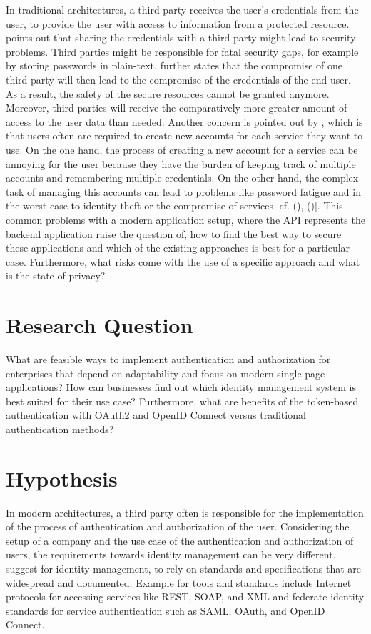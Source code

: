 In traditional architectures, a third party receives the user’s credentials from the user, to provide the user with access to information from a protected resource. \cite{Prasad:MMWPT} points out that sharing the credentials with a third party might lead to security problems. Third parties might be responsible for fatal security gaps, for example by storing passwords in plain-text. \cite{Prasad:MMWPT} further states that the compromise of one third-party will then lead to the compromise of the credentials of the end user. As a result, the safety of the secure resources cannot be granted anymore. Moreover, third-parties will receive the comparatively more greater amount of access to the user data than needed. Another concern is pointed out by \cite{Sakimura:OIDCC}, which is that users often are required to create new accounts for each service they want to use. On the one hand, the process of creating a new account for a service can be annoying for the user because they have the burden of keeping track of multiple accounts and remembering multiple credentials. On the other hand, the complex task of managing this accounts can lead to problems like password fatigue and in the worst case to identity theft or the compromise of services [cf. (\cite{Sakimura:OIDCC}), (\cite{Prasad:MMWPT})].
This common problems with a modern application setup, where the API represents the backend application raise the question of, how to find the best way to secure these applications and which of the existing approaches is best for a particular case. Furthermore, what risks come with the use of a specific approach and what is the state of privacy? 


\section{Research Question}

What are feasible ways to implement authentication and authorization for enterprises that depend on adaptability and focus on modern single page applications? How can businesses find out which identity management system is best suited for their use case? Furthermore, what are benefits of the token-based authentication with OAuth2 and OpenID Connect versus traditional authentication methods? 

\section{Hypothesis}

In modern architectures, a third party often is responsible for the implementation of the process of authentication and authorization of the user. Considering the setup of a company and the use case of the authentication and authorization of users, the requirements towards identity management can be very different. \cite{NIST:2017:DIG} suggest for identity management, to rely on standards and specifications that are widespread and documented. Example for tools and standards include Internet protocols for accessing services like REST, SOAP, and XML and federate identity standards for service authentication such as SAML, OAuth, and OpenID Connect.

